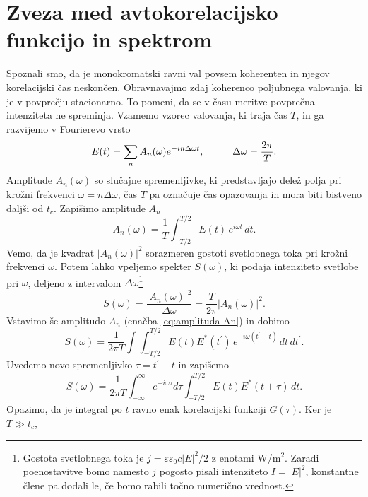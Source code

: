 \section{Zveza med avtokorelacijsko funkcijo in spektrom}

Spoznali smo, da je monokromatski ravni val povsem koherenten in njegov
korelacijski čas neskončen. Obravnavajmo zdaj koherenco poljubnega valovanja, ki
je v povprečju stacionarno. To pomeni, da se v času meritve povprečna intenziteta
ne spreminja. Vzamemo vzorec valovanja, ki traja čas $T$, in ga razvijemo 
v Fourierevo vrsto
\begin{equation}
E(t)=\sum_{n}A_{n}(\omega)e^{-in\Delta\omega t},\mbox{\hskip1cm}\Delta\omega=\frac{2\pi}{T}.
\end{equation}
Amplitude $A_{n}(\omega)$ so slučajne spremenljivke, ki predstavljajo delež polja pri 
krožni frekvenci $\omega=n\Delta\omega$, 
čas $T$ pa označuje čas opazovanja in mora biti bistveno daljši od $t_{c}$. 
Zapišimo amplitude $A_n$
\begin{equation}
A_{n}(\omega)=\frac{1}{T}\int_{-T/2}^{T/2}E(t)\, e^{i\omega t}\, dt.\label{eq:amplituda-An}
\end{equation}
 Vemo, da je kvadrat $|A_{n}(\omega)|^{2}$ sorazmeren gostoti 
svetlobnega toka pri krožni frekvenci $\omega$. Potem lahko vpeljemo 
spekter $S(\omega)$, ki podaja intenziteto svetlobe pri $\omega$,
deljeno z intervalom $\Delta\omega$\footnote{Gostota 
svetlobnega toka 
je $j = \varepsilon \varepsilon_0 c |E|^2/2$
z enotami W/m$^2$. Zaradi poenostavitve bomo namesto $j$ pogosto pisali intenziteto 
$I = |E|^2$, konstantne člene pa dodali le, če bomo rabili točno numerično vrednost.} 
\begin{equation}
S(\omega)=\frac{|A_{n}(\omega)|^{2}}{\Delta\omega}=\frac{T}{2\pi}|A_{n}(\omega)|^{2}.
\end{equation}
Vstavimo še amplitudo $A_{n}$ (enačba \ref{eq:amplituda-An}) in dobimo 
\begin{equation}
S(\omega) =\frac{1}{2\pi T}\int\int_{-T/2}^{T/2}E(t)E^{*}(t^{\prime})\, 
e^{-i\omega(t^{\prime}-t)}\, dt\, dt^{\prime}.
\end{equation}
Uvedemo novo spremenljivko $\tau=t^{\prime}-t$ in zapišemo
\begin{equation}
S(\omega)=\frac{1}{2\pi T}\int_{-\infty}^{\infty}e^{-i\omega\tau}d\tau\int_{-T/2}^{T/2}E(t)E^{*}(t+\tau)\, dt.
\label{eq:spekter}
\end{equation}
Opazimo, da je integral po $t$ ravno enak korelacijski funkciji $G(\tau)$. Ker je $T\gg t_{c}$,
